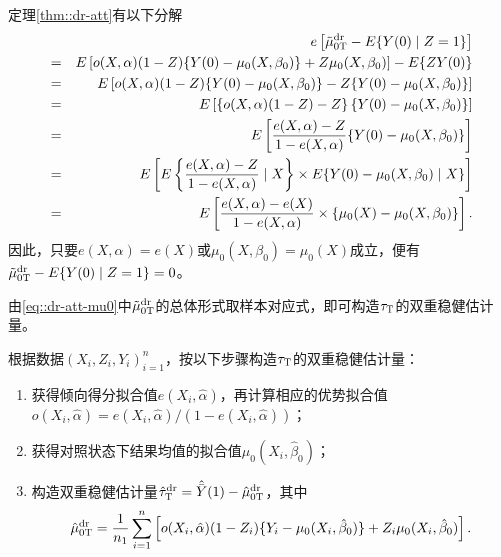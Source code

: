 \begin{myproof}{定理}{\ref{thm::dr-att}}有以下分解
\begin{eqnarray*}
&&  e\left[  \tilde{\mu}_{0\textsc{T}}^\text{dr}  -  E\{ Y(0) \mid Z=1 \} \right] \\
&=& E\left[ o(X,\alpha) ( 1-Z )  \{ Y(0) - \mu_0(X, \beta_0) \} + Z  \mu_0(X, \beta_0) \right] -  E\{ Z Y(0)   \} \\
&=& E\left[ o(X,\alpha) ( 1-Z ) \{ Y(0) - \mu_0(X, \beta_0) \} - Z  \{ Y (0) - \mu_0(X, \beta_0) \} \right] \\
&=& E\left[ \left\{ o(X,\alpha)  ( 1-Z  ) -Z\right\} \{ Y (0) - \mu_0(X, \beta_0) \}   \right] \\
&=& E\left[    \frac{ e(X,\alpha) - Z  }{1-  e(X,\alpha)}   \{ Y (0) - \mu_0(X, \beta_0) \}   \right] \\
&=& E\left[  E\left\{   \frac{ e(X,\alpha) - Z  }{1-  e(X,\alpha)}  \mid X \right\}  \times E  \{ Y (0) - \mu_0(X, \beta_0)  \mid X\}   \right] \\
&=& E\left[   \frac{ e(X,\alpha) - e(X)  }{1-  e(X,\alpha)} \times    \{ \mu_0(X) - \mu_0(X, \beta_0)  \}   \right] .
\end{eqnarray*}
因此，只要$ e(X,\alpha) = e(X)$或$\mu_0(X, \beta_0)=\mu_0(X) $成立，便有$\tilde{\mu}_{0\textsc{T}}^\text{dr}  -  E\{ Y(0) \mid Z=1 \}  = 0$。 
\end{myproof}


由\eqref{eq::dr-att-mu0}中$\tilde{\mu}_{0\textsc{T}}^\text{dr}$的总体形式取样本对应式，即可构造$\tau_\textsc{T}$的双重稳健估计量。 

\begin{definition}
\label{def::dr-att}
根据数据$(X_i, Z_i, Y_i)_{i=1}^n$，按以下步骤构造$\tau_\textsc{T}$的双重稳健估计量： 
\begin{enumerate}
[(1)]
\item
获得倾向得分拟合值$e(X_i, \hat{\alpha})$，再计算相应的优势拟合值$o(X_i, \hat{\alpha})  =  e(X_i, \hat{\alpha}) / (1- e(X_i, \hat{\alpha}))$； 
\item
获得对照状态下结果均值的拟合值$ \mu_0(X_i, \hat{\beta}_0) $； 
\item
构造双重稳健估计量$\hat{\tau}_\textsc{T}^\textup{dr} = \hat{\bar{Y}}(1) - \hat{\mu}_{0\textsc{T}}^\textup{dr}$，其中
$$
 \hat{\mu}_{0\textsc{T}}^\textup{dr}  
 = \frac{1}{n_1} \sum_{i=1}^n \left[ o(X_i,\hat{\alpha}) (1-Z_i)\{ Y_i-\mu_0(X_i, \hat{\beta}_0) \}      +Z_i \mu_0(X_i, \hat{\beta}_0)       \right].
$$
\end{enumerate}
\end{definition}


